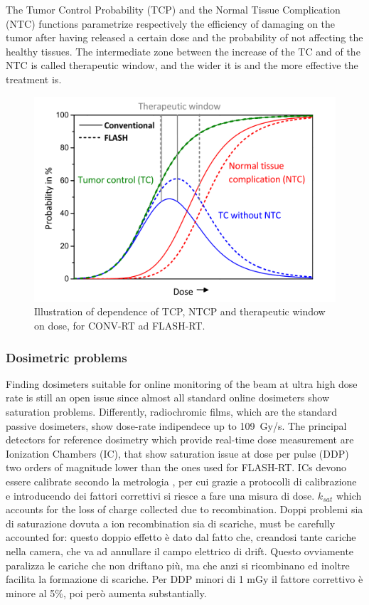         The Tumor Control Probability (TCP) and the Normal Tissue Complication (NTC) functions parametrize respectively the efficiency of damaging on the tumor after having released a certain dose and the probability of not affecting the healthy tissues. The intermediate zone between the increase of the TC and of the NTC is called therapeutic window, and the wider it is and the more effective the treatment is. 
        \begin{figure}
            \centering
            \includegraphics[width=.7\linewidth]{figures/pixel_detectors_usage/curve_flash.png}
            \caption{Illustration of dependence of TCP, NTCP and therapeutic window on dose, for CONV-RT ad FLASH-RT.}
            \label{fig:therapeutic_window}
        \end{figure}

    \subsubsection{Dosimetric problems}
        Finding dosimeters suitable for online monitoring of the beam at ultra high dose rate is still an open issue since almost all standard online dosimeters show saturation problems.
        Differently, radiochromic films, which are the standard passive dosimeters, show dose-rate indipendece up to \SI{109}{Gy/s}.
        The principal detectors for reference dosimetry which provide real-time dose measurement are Ionization Chambers (IC), that show saturation issue at dose per pulse (DDP) two orders of magnitude lower than the ones used for FLASH-RT.
        ICs devono essere calibrate secondo la metrologia , per cui grazie a protocolli di calibrazione e introducendo dei fattori correttivi si riesce a fare una misura di dose. $k_{sat}$ which accounts for the loss of charge collected due to recombination.
        Doppi problemi sia di saturazione dovuta a ion recombination sia di scariche, must be carefully accounted for: 
        questo doppio effetto è dato dal fatto che, creandosi tante cariche nella camera, che va ad annullare il campo elettrico di drift. Questo ovviamente paralizza le cariche che non driftano più, ma che anzi si ricombinano ed inoltre facilita la formazione di scariche.
        Per DDP minori di 1 mGy il fattore correttivo è minore al 5\%, poi però aumenta substantially.

